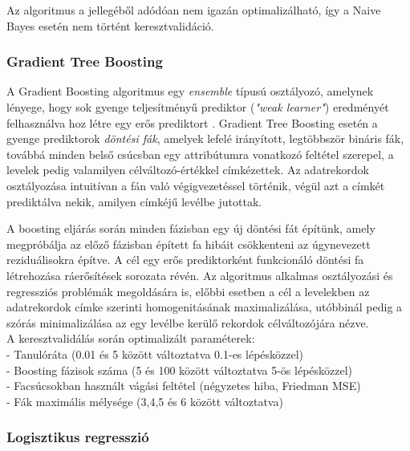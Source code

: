 \documentclass[12pt]{article}
\begin{document}
Az algoritmus a jellegéből adódóan nem igazán optimalizálható, így a Naive Bayes esetén nem történt keresztvalidáció.

\subsubsection{Gradient Tree Boosting}

A Gradient Boosting algoritmus egy \emph{ensemble} típusú osztályozó, amelynek lényege, hogy sok gyenge teljesítményű prediktor (\textit{"weak learner"}) eredményét felhasználva hoz létre egy erős prediktort \cite{friedman}. Gradient Tree Boosting esetén a gyenge prediktorok \textit{döntési fák}, amelyek lefelé irányított, legtöbbször bináris fák, továbbá minden belső csúcsban egy attribútumra vonatkozó feltétel szerepel, a levelek pedig valamilyen célváltozó-értékkel címkézettek. Az adatrekordok osztályozása intuitívan a fán való végigvezetéssel történik, végül azt a címkét prediktálva nekik, amilyen címkéjű levélbe jutottak.

A boosting eljárás során minden fázisban egy új döntési fát építünk, amely megpróbálja az előző fázisban épített fa hibáit csökkenteni az úgynevezett reziduálisokra építve. A cél egy erős prediktorként funkcionáló döntési fa létrehozása ráerősítések sorozata révén. Az algoritmus alkalmas osztályozási és regressziós problémák megoldására is, előbbi esetben a cél a levelekben az adatrekordok címke szerinti homogenitásának maximalizálása, utóbbinál pedig a szórás minimalizálása az egy levélbe kerülő rekordok célváltozójára nézve. \\



\noindent A keresztvalidálás során optimalizált paraméterek: \\
- Tanulóráta (0.01 és 5 között változtatva 0.1-es lépésközzel)\\
- Boosting fázisok száma (5 és 100 között változtatva 5-ös lépésközzel)\\
- Facsúcsokban használt vágási feltétel (négyzetes hiba, Friedman MSE) \\
- Fák maximális mélysége (3,4,5 és 6 között változtatva) \\

\subsubsection{Logisztikus regresszió}
\end{document}
